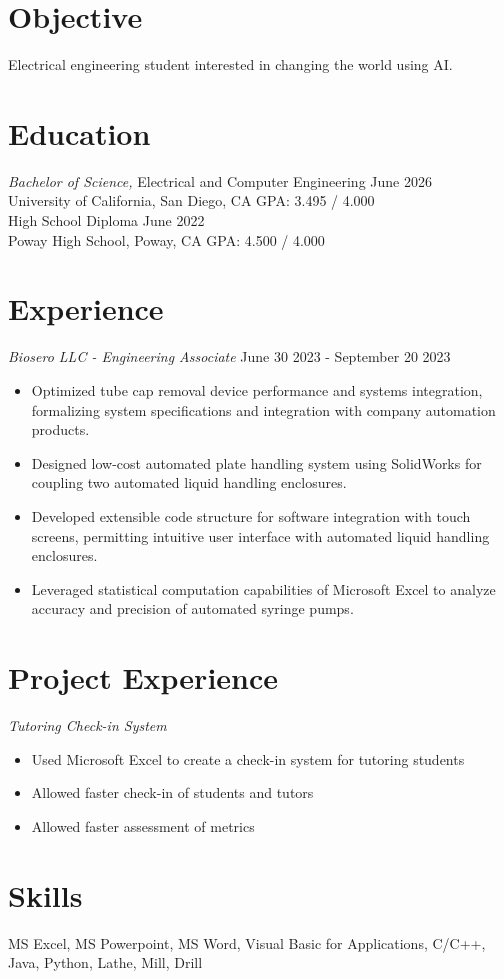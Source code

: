 \documentclass[line, margin]{res}
\begin{document}
\address{9450 Gilman Dr, \#123456, La Jolla, CA 92093}
\address{willderness@ucsd.edu, (858) 534-1234}
\begin{resume}
\section{Objective}
    Electrical engineering student interested in changing the world using AI.
\section{Education}
    {\sl Bachelor of Science,} Electrical and Computer Engineering \hfill June 2026\\
    University of California, San Diego, CA \hfil GPA: 3.495 / 4.000\\

    High School Diploma \hfill June 2022\\
    Poway High School, Poway, CA \hfill GPA: 4.500 / 4.000\\
\section{Experience}
    {\sl Biosero LLC - Engineering Associate} \hfill June 30 2023 - September 20 2023
    \begin{itemize}
        \item Optimized tube cap removal device performance and systems integration, formalizing system specifications and integration with company automation products.
        \item Designed low-cost automated plate handling system using SolidWorks for coupling two automated liquid handling enclosures.
        \item Developed extensible code structure for software integration with touch screens, permitting intuitive user interface with automated liquid handling enclosures.
        \item Leveraged statistical computation capabilities of Microsoft Excel to analyze accuracy and precision of automated syringe pumps.
    \end{itemize}

\section{Project Experience}
    {\sl Tutoring Check-in System}
    \begin{itemize}
        \item Used Microsoft Excel to create a check-in system for tutoring students
        \item Allowed faster check-in of students and tutors
        \item Allowed faster assessment of metrics
    \end{itemize}

\section{Skills}
    MS Excel, MS Powerpoint, MS Word, Visual Basic for Applications, C/C++, Java, Python, Lathe, Mill, Drill
\end{resume}
\end{document}
